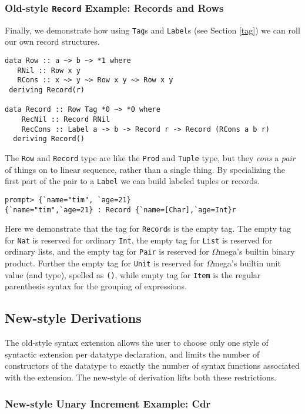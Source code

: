 \documentclass[11pt,twoside]{article}
\newcommand{\om}{$\Omega$mega}
\begin{document}
\subsubsection{Old-style {\tt Record} Example: Records and Rows}
Finally, we demonstrate how using {\tt Tag}s and {\tt Label}s
(see Section \ref{tag}) we can roll our own record structures.

\begin{verbatim}
data Row :: a ~> b ~> *1 where
   RNil :: Row x y
   RCons :: x ~> y ~> Row x y ~> Row x y
 deriving Record(r)

data Record :: Row Tag *0 ~> *0 where
    RecNil :: Record RNil
    RecCons :: Label a -> b -> Record r -> Record (RCons a b r)
  deriving Record()
\end{verbatim}
The {\tt Row} and {\tt Record} type are like the {\tt Prod} and
{\tt Tuple} type, but they {\it cons} a {\it pair} of things on to
linear sequence, rather than a single thing. By specializing
the first part of the pair to a {\tt Label} we can build labeled
tuples or records.

\begin{verbatim}
prompt> {`name="tim", `age=21}
{`name="tim",`age=21} : Record {`name=[Char],`age=Int}r
\end{verbatim}

Here we demonstrate that the tag for {\tt Record}s is the empty tag.
The empty tag for {\tt Nat} is reserved for ordinary {\tt Int},
the empty tag for {\tt List} is reserved for ordinary lists,
and the empty tag for {\tt Pair} is reserved for \om's builtin binary
product. Further the empty tag for {\tt Unit} is reserved for \om's builtin
unit value (and type), spelled as \verb+()+, while empty tag for {\tt Item} is
the regular parenthesis syntax for the grouping of expressions.

\subsection{New-style Derivations}

The old-style syntax extension allows the user to choose only one style of syntactic extension
per datatype declaration, and limits the number of constructors of the datatype to exactly the number
of syntax functions associated with the extension. The new-style of derivation lifts both these restrictions.

\subsubsection{New-style Unary Increment Example: Cdr}
\end{document}

